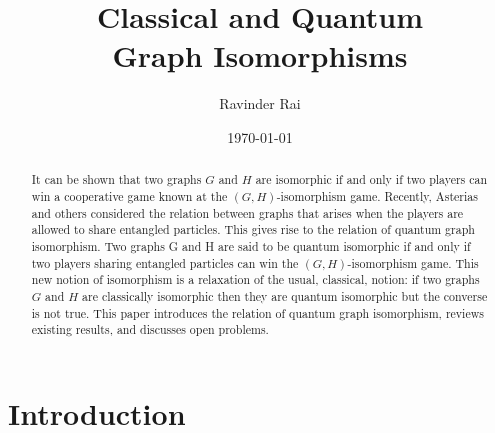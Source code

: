 \documentclass[12pt]{article}
\title{\textbf{Classical and Quantum \\ Graph Isomorphisms}}
\author{Ravinder Rai}
\date{\today}
\begin{document}
 

\maketitle

\begin{abstract}
  It can be shown that two graphs $G$ and $H$ are isomorphic if and
  only if two players can win a cooperative game known at the
  $(G,H)$-isomorphism game. Recently, Asterias and others considered
  the relation between graphs that arises when the players are allowed
  to share entangled particles. This gives rise to the relation of
  quantum graph isomorphism. Two graphs G and H are said to be quantum
  isomorphic if and only if two players sharing entangled particles
  can win the $(G,H)$-isomorphism game. This new notion of isomorphism
  is a relaxation of the usual, classical, notion: if two graphs $G$
  and $H$ are classically isomorphic then they are quantum isomorphic
  but the converse is not true. This paper introduces the relation of
  quantum graph isomorphism, reviews existing results, and discusses
  open problems.
\end{abstract}

\section{Introduction}
\label{sec:intro}
\end{document}
